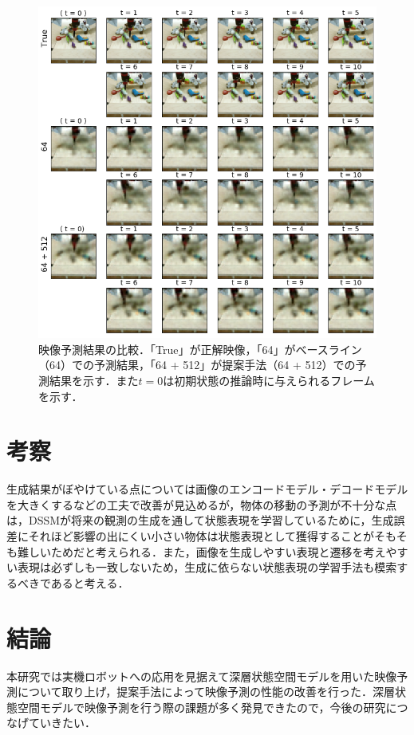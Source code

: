 \documentclass[10pt, twocolumn]{jarticle}
\begin{document}
\begin{figure}[h]
  \begin{center}
      \includegraphics[width=0.75\linewidth]{./figures/pred_a.png}
      \caption[映像予測結果の比較]{\small 映像予測結果の比較．「True」が正解映像，「64」がベースライン（64）での予測結果，「64 + 512」が提案手法（64 + 512）での予測結果を示す．また$t = 0$は初期状態の推論時に与えられるフレームを示す．}
      \label{fig:pred_a}
  \end{center}
  \end{figure}
\normalsize

\section{考察}
生成結果がぼやけている点については画像のエンコードモデル・デコードモデルを大きくするなどの工夫で改善が見込めるが，物体の移動の予測が不十分な点は，DSSMが将来の観測の生成を通して状態表現を学習しているために，生成誤差にそれほど影響の出にくい小さい物体は状態表現として獲得することがそもそも難しいためだと考えられる．また，画像を生成しやすい表現と遷移を考えやすい表現は必ずしも一致しないため，生成に依らない状態表現の学習手法も模索するべきであると考える．

\section{結論}

本研究では実機ロボットへの応用を見据えて深層状態空間モデルを用いた映像予測について取り上げ，提案手法によって映像予測の性能の改善を行った．深層状態空間モデルで映像予測を行う際の課題が多く発見できたので，今後の研究につなげていきたい．



\end{document}

